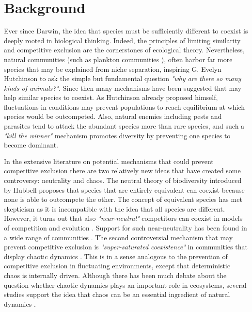 \section{Background}
\label{sec:Background}
Ever since Darwin, the idea that species must be sufficiently different to coexist is deeply rooted in biological thinking. Indeed, the principles of limiting similarity \citep{MacArthur} and competitive exclusion \citep{Hardin1960} are the cornerstones of ecological theory. Nevertheless, natural communities (such as plankton communities \citep{Hutchinson1961}), often harbor far more species that may be explained from niche separation, inspiring G. Evelyn Hutchinson \citeyearpar{Hutchinson} to ask the simple but fundamental question \textit{"why are there so many kinds of animals?"}. Since then many mechanisms have been suggested that may help similar species to coexist. As Hutchinson \citeyearpar{Hutchinson1961} already proposed himself, fluctuations in conditions may prevent populations to reach equilibrium at which species would be outcompeted. Also, natural enemies including pests and parasites tend to attack the abundant species more than rare species, and such a \textit{"kill the winner"} \citep{Winter2010} mechanism promotes diversity by preventing one species to become dominant.

In the extensive literature on potential mechanisms that could prevent competitive exclusion there are two relatively new ideas that have created some controversy: neutrality and chaos. The neutral theory of biodiversity introduced by Hubbell \citeyearpar{Hubbell2001} proposes that species that are entirely equivalent can coexist because none is able to outcompete the other. The concept of equivalent species has met skepticism as it is incompatible with the idea that all species are different. However, it turns out that also \textit{"near-neutral"} competitors can coexist in models of competition and evolution \citep{Scheffer2006, Scheffer2018}. Support for such near-neutrality has been found in a wide range of communities \citep{Vergnon2013, Segura2013}. The second controversial mechanism that may prevent competitive exclusion is \textit{"super-saturated coexistence"} in communities that display chaotic dynamics \citep{Huisman1999}. This is in a sense analogous to the prevention of competitive exclusion in fluctuating environments, except that deterministic chaos is internally driven. Although there has been much debate about the question whether chaotic dynamics plays an important role in ecosystems, several studies support the idea that chaos can be an essential ingredient of natural dynamics \citep{Armstrong1980, Huisman1999, Beninca2008}.

